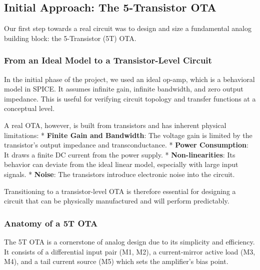 \documentclass[
  letterpaper,
  DIV=11,
  numbers=noendperiod]{scrreprt}
\begin{document}
\subsection{Initial Approach: The 5-Transistor
OTA}\label{initial-approach-the-5-transistor-ota}

Our first step towards a real circuit was to design and size a
fundamental analog building block: the 5-Transistor (5T) OTA.

\subsubsection{From an Ideal Model to a Transistor-Level
Circuit}\label{from-an-ideal-model-to-a-transistor-level-circuit}

In the initial phase of the project, we used an ideal op-amp, which is a
behavioral model in SPICE. It assumes infinite gain, infinite bandwidth,
and zero output impedance. This is useful for verifying circuit topology
and transfer functions at a conceptual level.

A real OTA, however, is built from transistors and has inherent physical
limitations: * \textbf{Finite Gain and Bandwidth}: The voltage gain is
limited by the transistor's output impedance and transconductance. *
\textbf{Power Consumption}: It draws a finite DC current from the power
supply. * \textbf{Non-linearities}: Its behavior can deviate from the
ideal linear model, especially with large input signals. *
\textbf{Noise}: The transistors introduce electronic noise into the
circuit.

Transitioning to a transistor-level OTA is therefore essential for
designing a circuit that can be physically manufactured and will perform
predictably.

\subsubsection{Anatomy of a 5T OTA}\label{anatomy-of-a-5t-ota}

The 5T OTA is a cornerstone of analog design due to its simplicity and
efficiency. It consists of a differential input pair (M1, M2), a
current-mirror active load (M3, M4), and a tail current source (M5)
which sets the amplifier's bias point.
\end{document}
